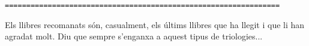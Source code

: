 \begin{verbatim}
================================================================
\end{verbatim}

Els llibres recomanats són, casualment, els últims llibres que ha llegit i que li han agradat molt. Diu que sempre s'enganxa a aquest tipus de triologies...
